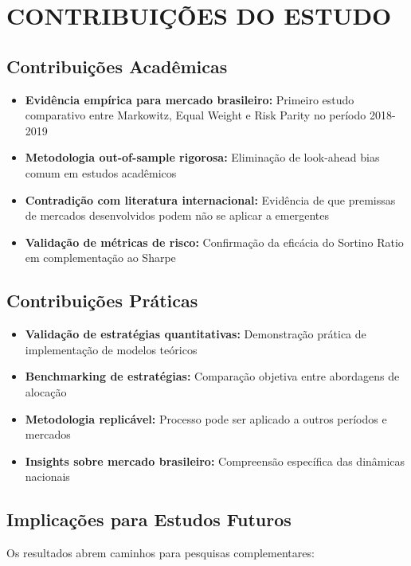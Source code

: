 \section{CONTRIBUIÇÕES DO ESTUDO}

\subsection{Contribuições Acadêmicas}

\begin{itemize}
    \item \textbf{Evidência empírica para mercado brasileiro:} Primeiro estudo comparativo entre Markowitz, Equal Weight e Risk Parity no período 2018-2019
    \item \textbf{Metodologia out-of-sample rigorosa:} Eliminação de look-ahead bias comum em estudos acadêmicos
    \item \textbf{Contradição com literatura internacional:} Evidência de que premissas de mercados desenvolvidos podem não se aplicar a emergentes
    \item \textbf{Validação de métricas de risco:} Confirmação da eficácia do Sortino Ratio em complementação ao Sharpe
\end{itemize}

\subsection{Contribuições Práticas}

\begin{itemize}
    \item \textbf{Validação de estratégias quantitativas:} Demonstração prática de implementação de modelos teóricos
    \item \textbf{Benchmarking de estratégias:} Comparação objetiva entre abordagens de alocação
    \item \textbf{Metodologia replicável:} Processo pode ser aplicado a outros períodos e mercados
    \item \textbf{Insights sobre mercado brasileiro:} Compreensão específica das dinâmicas nacionais
\end{itemize}

\subsection{Implicações para Estudos Futuros}

Os resultados abrem caminhos para pesquisas complementares:

